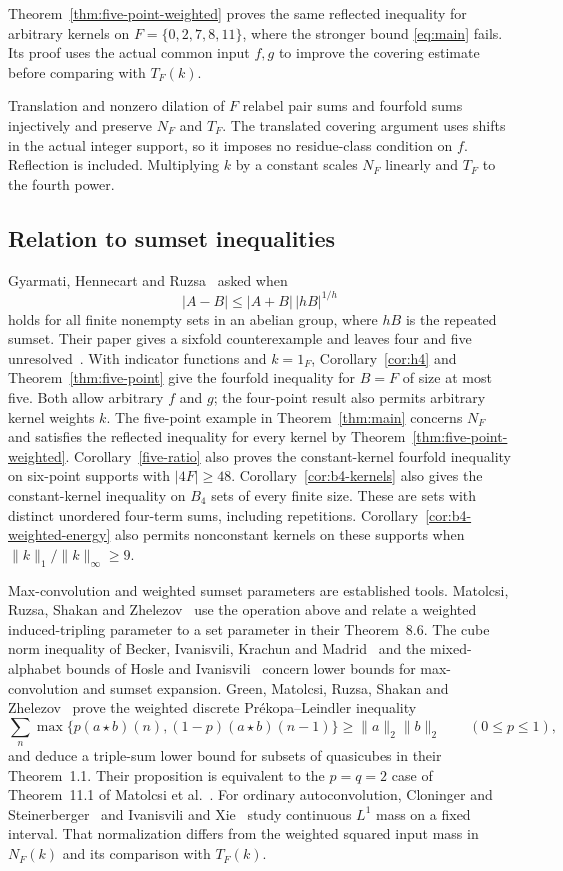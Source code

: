 \documentclass[11pt]{article}
\theoremstyle{remark}
\numberwithin{equation}{section}
\begin{document}
Theorem~\ref{thm:five-point-weighted} proves the same reflected inequality
for arbitrary kernels on $F=\{0,2,7,8,11\}$, where the stronger bound
\eqref{eq:main} fails. Its proof uses the actual common input $f,g$
to improve the covering estimate before comparing with $T_F(k)$.

Translation and nonzero dilation of $F$ relabel pair sums and fourfold sums
injectively and preserve $N_F$ and $T_F$. The translated covering argument
uses shifts in the actual integer support, so it imposes no residue-class
condition on $f$. Reflection is included. Multiplying $k$ by a constant
scales $N_F$ linearly and $T_F$ to the fourth power.

\subsection{Relation to sumset inequalities}
Gyarmati, Hennecart and Ruzsa~\cite[p.~177, equation~(9)]{ghr} asked when
\[
 |A-B|\le |A+B|\,|hB|^{1/h}
\]
holds for all finite nonempty sets in an abelian group, where $hB$ is the
repeated sumset.
Their paper gives a sixfold counterexample and leaves four and five
unresolved~\cite[p.~182]{ghr}. With indicator functions and $k=1_F$,
Corollary~\ref{cor:h4} and Theorem~\ref{thm:five-point} give the fourfold
inequality for $B=F$ of size at most five. Both allow arbitrary $f$ and
$g$; the four-point result also permits arbitrary kernel weights $k$.
The five-point example in Theorem~\ref{thm:main} concerns $N_F$ and
satisfies the reflected inequality for every kernel by
Theorem~\ref{thm:five-point-weighted}.
Corollary~\ref{five-ratio} also proves the constant-kernel fourfold inequality
on six-point supports with $|4F|\ge48$.
Corollary~\ref{cor:b4-kernels} also gives the constant-kernel inequality
on $B_4$ sets of every finite size. These are sets with distinct unordered
four-term sums, including repetitions. Corollary~\ref{cor:b4-weighted-energy}
also permits nonconstant kernels on these supports when
$\|k\|_1/\|k\|_\infty\ge9$.

Max-convolution and weighted sumset parameters are established tools.
Matolcsi, Ruzsa, Shakan and Zhelezov~\cite[Definition~8.1]{mrsz} use the
operation above and relate a weighted induced-tripling parameter to a set
parameter in their Theorem~8.6. The cube norm inequality of Becker,
Ivanisvili, Krachun and Madrid~\cite[Theorem~1.3]{bikm} and the
mixed-alphabet bounds of Hosle and Ivanisvili~\cite[Theorem~1.5]{hi}
concern lower bounds for max-convolution and sumset expansion.
Green, Matolcsi, Ruzsa, Shakan and Zhelezov~\cite[Proposition~2.1]{gmrsz}
prove the weighted discrete Pr\'ekopa--Leindler inequality
\[
 \sum_n\max\{p(a\star b)(n),(1-p)(a\star b)(n-1)\}
 \ge \|a\|_2\|b\|_2\qquad(0\le p\le1),
\]
and deduce a triple-sum lower bound for subsets of quasicubes in their
Theorem~1.1. Their proposition is equivalent to the $p=q=2$ case of
Theorem~11.1 of Matolcsi et al.~\cite{mrsz}.
For ordinary autoconvolution, Cloninger and
Steinerberger~\cite[Section~1.2]{cs} and Ivanisvili and
Xie~\cite[Theorem~5]{ix} study continuous $L^1$ mass on a fixed interval.
That normalization differs from the weighted squared input mass in $N_F(k)$
and its comparison with $T_F(k)$.
\end{document}
